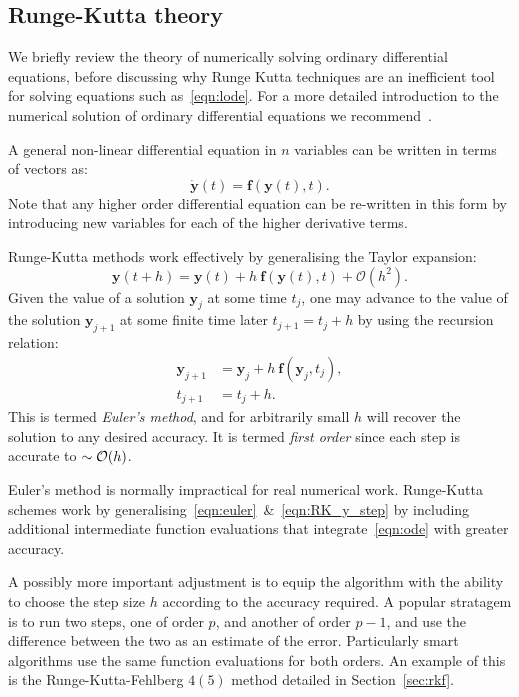 \subsection{Runge-Kutta theory}
\label{sec:rk}
We briefly review the theory of numerically solving ordinary differential equations, before discussing why Runge Kutta techniques are an inefficient tool for solving equations such as~\eqref{eqn:lode}.
For a more detailed introduction to the numerical solution of ordinary differential equations we recommend~\cite{Press+2007}.

A general non-linear differential equation in \(n\) variables can be written in terms of vectors as:
\begin{equation}
  \dot{\mathbf{y}}(t) = \mathbf{f}(\mathbf{y}(t),t).
  \label{eqn:ode}
\end{equation}
Note that any higher order differential equation can be re-written in this form by introducing new variables for each of the higher derivative terms.

Runge-Kutta methods work effectively by generalising the Taylor expansion:
\begin{equation}
  \mathbf{y}(t+h)  = \mathbf{y}(t) + h\:\mathbf{f}(\mathbf{y}(t),t) + \mathcal{O}(h^2).
  \label{eqn:euler}
\end{equation}
Given the value of a solution \(\mathbf{y}_j\) at some time \(t_j\), one may advance to the value of the solution \(\mathbf{y}_{j+1}\) at some finite time later \(t_{j+1} = t_j + h\) by using the recursion relation:
\begin{align}
  \mathbf{y}_{j+1} &=  \mathbf{y}_{j} + h\:\mathbf{f}(\mathbf{y}_j,t_j),
  \label{eqn:RK_y_step}\\
  t_{j+1} &=  t_{j} + h.
  \label{eqn:RK_t_step}
\end{align}
This is termed {\em Euler's method}, and for arbitrarily small \(h\) will recover the solution to any desired accuracy. It is termed {\em first order\/} since each step is accurate to \({\sim\mathcal{O}{\left(h\right)}}\).

Euler's method is normally impractical for real numerical work. Runge-Kutta schemes work by generalising~\eqref{eqn:euler}~\&~\eqref{eqn:RK_y_step} by including additional intermediate function evaluations that integrate~\eqref{eqn:ode} with greater accuracy.

A possibly more important adjustment is to equip the algorithm with the ability to choose the step size \(h\) according to the accuracy required. A popular stratagem is to run two steps, one of order \(p\), and another of order \(p-1\), and use the difference between the two as an estimate of the error. Particularly smart algorithms use the same function evaluations for both orders. An example of this is the Runge-Kutta-Fehlberg \(4(5)\) method detailed in Section~\ref{sec:rkf}.

